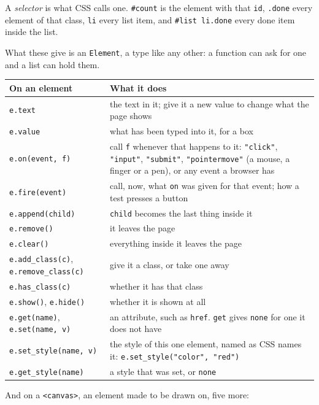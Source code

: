 A \emph{selector} is what CSS calls one. \verb|#count| is the element
with that \verb|id|, \verb|.done| every element of that class,
\verb|li| every list item, and \verb|#list li.done| every done item
inside the list.

What these give is an \verb|Element|, a type like any other: a
function can ask for one and a list can hold them.

\begin{longtable}{lP{7.4cm}}
\toprule
On an element & What it does \\
\midrule
\endhead
\verb|e.text| & the text in it; give it a new value to change what the
  page shows \\
\verb|e.value| & what has been typed into it, for a box \\
\verb|e.on(event, f)| & call \verb|f| whenever that happens to it:
  \verb|"click"|, \verb|"input"|, \verb|"submit"|, \verb|"pointermove"|
  (a mouse, a finger or a pen), or any event a browser has \\
\verb|e.fire(event)| & call, now, what \verb|on| was given for that
  event; how a test presses a button \\
\verb|e.append(child)| & \verb|child| becomes the last thing inside it \\
\verb|e.remove()| & it leaves the page \\
\verb|e.clear()| & everything inside it leaves the page \\
\verb|e.add_class(c)|, \verb|e.remove_class(c)| & give it a class, or
  take one away \\
\verb|e.has_class(c)| & whether it has that class \\
\verb|e.show()|, \verb|e.hide()| & whether it is shown at all \\
\verb|e.get(name)|, \verb|e.set(name, v)| & an attribute, such as
  \verb|href|. \verb|get| gives \verb|none| for one it does not have \\
\verb|e.set_style(name, v)| & the style of this one element, named as
  CSS names it: \verb|e.set_style("color", "red")| \\
\verb|e.get_style(name)| & a style that was set, or \verb|none| \\
\bottomrule
\end{longtable}

And on a \verb|<canvas>|, an element made to be drawn on, five more:


